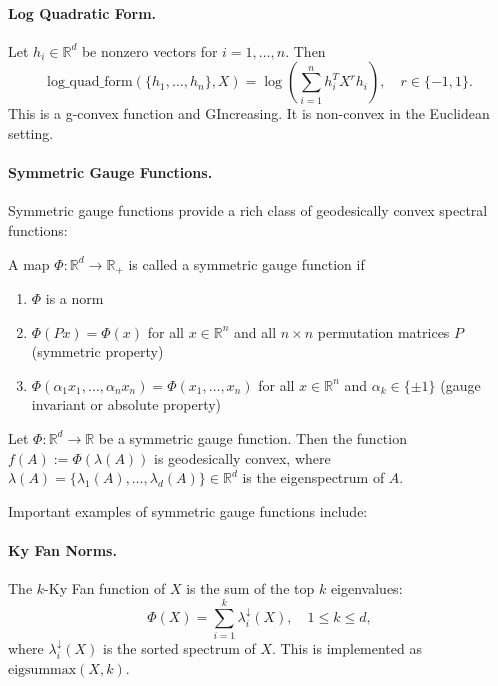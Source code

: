 \paragraph{Log Quadratic Form.} Let $h_i \in \mathbb{R}^d$ be nonzero vectors for $i = 1, \ldots, n$. Then
\begin{equation}
\text{log\_quad\_form}(\{h_1, \ldots, h_n\}, X) = \log\left(\sum_{i=1}^n h_i^T X^r h_i\right), \quad r \in \{-1, 1\}.
\end{equation}
This is a g-convex function and GIncreasing. It is non-convex in the Euclidean setting.

\paragraph{Symmetric Gauge Functions.} Symmetric gauge functions provide a rich class of geodesically convex spectral functions:

\begin{definition}
A map $\Phi: \mathbb{R}^d \rightarrow \mathbb{R}_+$ is called a symmetric gauge function if
\begin{enumerate}
\item $\Phi$ is a norm
\item $\Phi(Px) = \Phi(x)$ for all $x \in \mathbb{R}^n$ and all $n \times n$ permutation matrices $P$ (symmetric property)
\item $\Phi(\alpha_1 x_1, \ldots, \alpha_n x_n) = \Phi(x_1, \ldots, x_n)$ for all $x \in \mathbb{R}^n$ and $\alpha_k \in \{±1\}$ (gauge invariant or absolute property)
\end{enumerate}
\end{definition}

\begin{proposition}
Let $\Phi: \mathbb{R}^d \rightarrow \mathbb{R}$ be a symmetric gauge function. Then the function $f(A) := \Phi(\lambda(A))$ is geodesically convex, where $\lambda(A) = \{\lambda_1(A), \ldots, \lambda_d(A)\} \in \mathbb{R}^d$ is the eigenspectrum of $A$.
\end{proposition}

Important examples of symmetric gauge functions include:

\paragraph{Ky Fan Norms.} The $k$-Ky Fan function of $X$ is the sum of the top $k$ eigenvalues:
\begin{equation}
\Phi(X) = \sum_{i=1}^k \lambda_i^{\downarrow}(X), \quad 1 \leq k \leq d,
\end{equation}
where $\lambda_i^{\downarrow}(X)$ is the sorted spectrum of $X$. This is implemented as $\text{eigsummax}(X, k)$.

